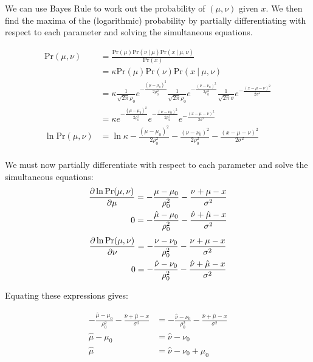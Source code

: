 \documentclass[10pt,\jkfside,a4paper]{article}
\begin{document}
\begin{enumerate}
\begin{enumerate}[label=(\alph*)]
We can use Bayes Rule to work out the probability of $(\mu, \nu)$ given $x$.
We then find the maxima of the (logarithmic) probability by partially
differentiating with respect to each parameter and solving the simultaneous
equations.

\[
\begin{split}
\text{Pr}(\mu, \nu)
&= \frac{\text{Pr}(\mu)\text{Pr}(\nu \ | \ \mu) \text{Pr}(x \ | \ \mu, \nu)
}{\text{Pr}(x)} \\
&= \kappa \text{Pr}(\mu)\text{Pr}(\nu) \text{Pr}(x \ | \ \mu, \nu) \\
&= \kappa \frac{1}{\sqrt{2\pi}\rho_0}e^{-\frac{(\mu - \mu_0)^2}{2\rho_0^2}}
\frac{1}{\sqrt{2\pi}\rho_0}e^{-\frac{(\nu - \nu_0)^2}{2\rho_0^2}}
\frac{1}{\sqrt{2\pi}\sigma}e^{-\frac{(x - \mu - \nu)^2}{2\sigma^2}} \\
&= \kappa e^{-\frac{(\mu - \mu_0)^2}{2\rho_0^2}}e^{-\frac{(\nu - \nu_0)^2}{2\rho_0^2}}e^{-\frac{(x - \mu - \nu)^2}{2\sigma^2}} \\
\ln\text{Pr}(\mu, \nu)
&= \ln\kappa -\frac{(\mu - \mu_0)^2}{2\rho_0^2} -\frac{(\nu - \nu_0)
^2}{2\rho_0^2}-\frac{(x - \mu - \nu)^2}{2\sigma^2} \\
\end{split}
\]

We must now partially differentiate with respect to each parameter and solve
the simultaneous equations:
\[
\begin{split}
\pdv{\ln\text{Pr}(\mu, \nu)}{\mu} &= - \frac{\mu - \mu_0}{\rho_0^2} -
\frac{\nu + \mu - x}{\sigma^2} \\
0 &= - \frac{\hat{\mu} - \mu_0}{\rho_0^2} -\frac{\hat{\nu} + \hat{\mu} -
x}{\sigma^2}
\end{split}
\]
\[
\begin{split}
\pdv{\ln\text{Pr}(\mu, \nu)}{\nu} &= - \frac{\nu - \nu_0}{\rho_0^2} -
\frac{\nu + \mu - x}{\sigma^2} \\
0 &= - \frac{\hat{\nu} - \nu_0}{\rho_0^2} -\frac{\hat{\nu} + \hat{\mu} -
x}{\sigma^2}
\end{split}
\]

Equating these expressions gives:

\[
\begin{split}
- \frac{\hat{\mu} - \mu_0}{\rho_0^2} -\frac{\hat{\nu} + \hat{\mu} -
x}{\sigma^2} &= - \frac{\hat{\nu} - \nu_0}{\rho_0^2} -\frac{\hat{\nu} +
\hat{\mu} - x}{\sigma^2} \\
\hat{\mu} - \mu_0 &= \hat{\nu} - \nu_0 \\
\hat{\mu} &= \hat{\nu} - \nu_0 + \mu_0 \\
\end{split}
\]


\end{enumerate}
\end{enumerate}
\end{document}
